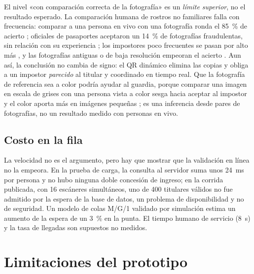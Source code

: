 El nivel «con comparación correcta de la fotografía» es un \emph{límite superior}, no el
resultado esperado. La comparación humana de rostros no familiares falla con frecuencia: comparar
a una persona en vivo con una fotografía ronda el 85~\% de acierto \cite{megreya2008matching};
oficiales de pasaportes aceptaron un 14~\% de fotografías fraudulentas, sin relación con su
experiencia \cite{white2014passport}; los impostores poco frecuentes se pasan por alto más
\cite{papesh2014infrequent}, y las fotografías antiguas o de baja resolución empeoran el acierto
\cite{megreya2013monthsapart,bindemann2013pixelation}. Aun así, la conclusión no cambia de signo:
el QR dinámico elimina las copias y obliga a un impostor \emph{parecido} al titular y coordinado en
tiempo real. Que la fotografía de referencia sea a color podría ayudar al guardia, porque comparar
una imagen en escala de grises con una persona vista a color sesga hacia aceptar al impostor
\cite{bobak2019greyarea} y el color aporta más en imágenes pequeñas \cite{yip2002color}; es una
inferencia desde pares de fotografías, no un resultado medido con personas en vivo.

\subsection{Costo en la fila}
\label{sec:prototipo-fila}

La velocidad no es el argumento, pero hay que mostrar que la validación en línea no la empeora. En
la prueba de carga, la consulta al servidor suma unos 24~ms por persona y no hubo ninguna doble
concesión de ingreso; en la corrida publicada, con 16 escáneres simultáneos, uno de 400 titulares
válidos no fue admitido por la espera de la base de datos, un problema de disponibilidad y no de
seguridad. Un modelo de colas M/G/1 validado por simulación estima un aumento de la espera de un
3~\% en la punta. El tiempo humano de servicio (8~s) y la tasa de llegadas son supuestos no
medidos.

\section{Limitaciones del prototipo}
\label{sec:prototipo-limitaciones}

